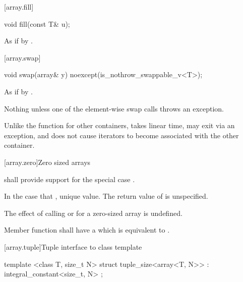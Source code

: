 [array.fill]{}

%
\begin{itemdecl}
void fill(const T& u);
\end{itemdecl}

\begin{itemdescr}
\pnum
\effects As if by .
\end{itemdescr}

[array.swap]{}

%
\begin{itemdecl}
void swap(array& y) noexcept(is_nothrow_swappable_v<T>);
\end{itemdecl}

\begin{itemdescr}
\pnum
\effects As if by .

\pnum
\throws Nothing unless one of the element-wise swap calls throws an exception.

\pnum
\realnote Unlike the  function for other containers, 
takes linear time, may exit via an exception, and does not cause iterators to
become associated with the other container.
\end{itemdescr}

[array.zero]{Zero sized arrays}

%
\pnum{} shall provide support for the special case .

\pnum In the case that ,  unique value.
The return value of  is unspecified.

\pnum
The effect of calling  or  for a zero-sized array is
undefined.

\pnum
Member function  shall have a 
which is equivalent to .

[array.tuple]{Tuple interface to class template }
%
%
%
%
\begin{itemdecl}
template <class T, size_t N>
  struct tuple_size<array<T, N>> : integral_constant<size_t, N> { };
\end{itemdecl}

